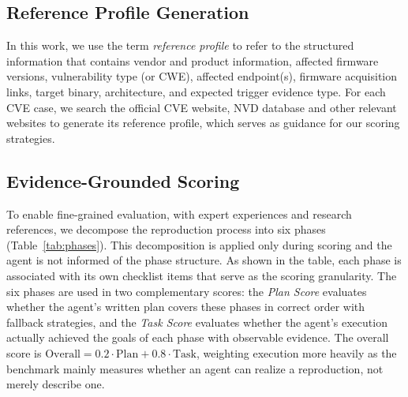 \subsection{Reference Profile Generation}
\label{sec:dossier}

In this work, we use the term \textit{reference profile} to refer to the
structured information that contains vendor and product information, affected firmware versions, vulnerability type (or CWE), affected endpoint(s), firmware acquisition links, target binary, architecture, and expected trigger evidence type. For each CVE case, we search the official CVE website, NVD database and other relevant websites to generate its reference profile, which serves as guidance for our scoring strategies.

\subsection{Evidence-Grounded Scoring}
\label{sec:scoring}
To enable fine-grained evaluation, with expert experiences and research references, we decompose the reproduction process into six phases (Table~\ref{tab:phases}). 
This decomposition is applied only during scoring and the agent is not informed of the phase structure. 
As shown in the table, each phase is associated with its own checklist items that serve as the scoring granularity. 
The six phases are used in two complementary scores: the \emph{Plan Score} evaluates whether the agent's written plan covers these phases in correct order with fallback strategies, and the \emph{Task Score} evaluates whether the agent's execution actually achieved the goals of each phase with observable evidence. The overall score is $\text{Overall}=0.2\cdot\text{Plan}+0.8\cdot\text{Task}$, weighting execution more heavily as the benchmark mainly measures whether an agent can realize a reproduction, not merely describe one.


